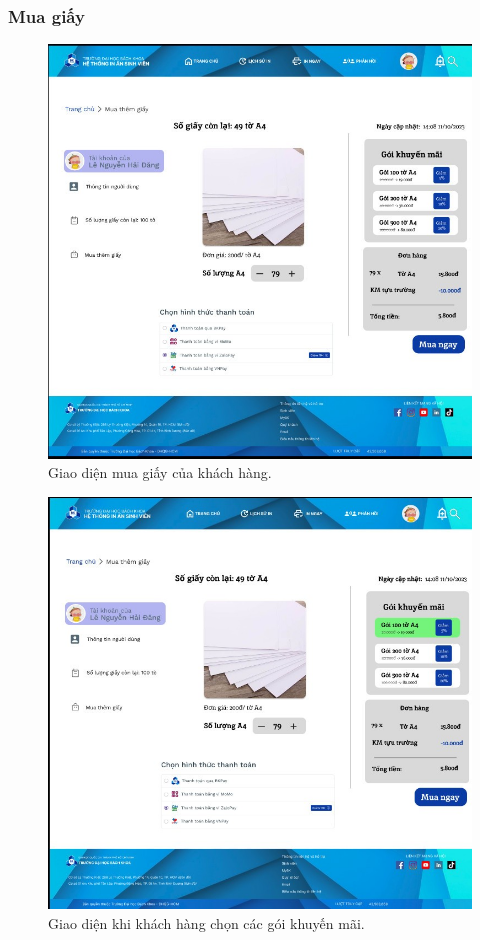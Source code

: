 \subsubsection{Mua giấy}
\begin{figure}[H]
    \begin{center}
        \includegraphics[width=1\textwidth]{Images/Figma/buy_main.png}
        \caption{Giao diện mua giấy của khách hàng.}
        \label{fig:arch}
    \end{center}
\end{figure}
\begin{figure}[H]
    \begin{center}
        \includegraphics[width=1\textwidth]{Images/Figma/buy_package.png}
        \caption{Giao diện khi khách hàng chọn các gói khuyến mãi.}
        \label{fig:arch}
    \end{center}
\end{figure}
